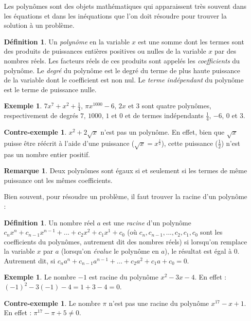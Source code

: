 \documentclass[a4paper,13pt]{scrreprt}
\theoremstyle{plain}
\theoremstyle{definition}
\newtheorem{déf}[subsection]{Définition}
\newtheorem{exe}[subsection]{Exemple}
\newtheorem{con}[subsection]{Contre-exemple}
\newtheorem{rema}[subsection]{Remarque}
\begin{document}
Les polynômes sont des objets mathématiques qui apparaissent très souvent dans les équations et dans les inéquations que l'on doit résoudre pour trouver la solution à un problème.

\begin{déf}
	Un \emph{polynôme} en la variable $x$ est une somme dont les termes sont des produits de puissances entières positives ou nulles de la variable $x$ par des nombres réels. Les facteurs réels de ces produits sont appelés les \emph{coefficients} du polynôme. Le \emph{degré} du polynôme est le degré du terme de plus haute puissance de la variable dont le coefficient est non nul. Le \emph{terme indépendant} du polynôme est le terme de puissance nulle.
\end{déf}

\begin{exe}
	$7x^7 + x^2 +\frac{1}{4}$, $\pi x^{1000} -6$, $2x$ et $3$ sont quatre polynômes, respectivement de degrés $7$, $1000$, $1$ et $0$ et de termes indépendants $\frac{1}{4}$, $-6$, $0$ et $3$.
\end{exe}
\begin{con}
	$x^2 + 2\sqrt{x}$ n'est pas un polynôme. En effet, bien que $\sqrt{x}$ puisse être réécrit à l'aide d'une puissance ($\sqrt{x}=x^{\frac{1}{2}}$), cette puissance ($\frac{1}{2}$) n'est pas un nombre entier positif.
\end{con}
\begin{rema}
	Deux polynômes sont égaux si et seulement si les termes de même puissance ont les mêmes coefficients.
\end{rema}
Bien souvent, pour résoudre un problème, il faut trouver la racine d'un polynôme :
\begin{déf}
	Un nombre réel $a$ est une \emph{racine} d'un polynôme $c_n x^n + c_{n-1} x^{n-1} + ... + c_2 x^2 + c_1 x^1 + c_0$ (où $c_n , c_{n-1} , ... , c_2 , c_1 , c_0$ sont les coefficients du polynômes, autrement dit des nombres réels) si lorsqu'on remplace la variable $x$ par $a$ (lorsqu'on \emph{évalue} le polynôme en $a$), le résultat est égal à $0$. Autrement dit, si $c_n a^n + c_{n-1} a^{n-1} + ... + c_2 a^2 + c_1 a + c_0 = 0$.
\end{déf}
\begin{exe}
	Le nombre $-1$ est racine du polynôme $x^2-3x-4$. En effet : $(-1)^2 - 3(-1) - 4 = 1 + 3 - 4 = 0$.
\end{exe}
\begin{con}
	Le nombre $\pi$ n'est pas une racine du polynôme $x^{17}-x+1$. En effet : ${\pi}^{17} - \pi + 5 \neq 0$.
\end{con}
\end{document}
